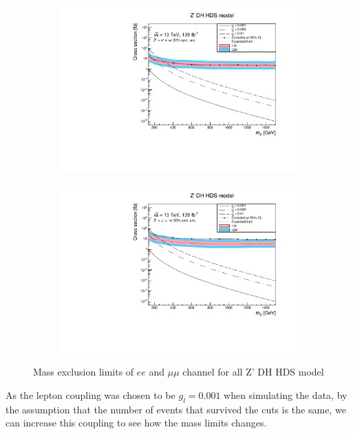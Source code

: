 \documentclass[14pt, a4paper]{book}
\begin{document}
\begin{figure}[!ht]
	\centering
   \begin{subfigure}[b]{0.49\textwidth}
      \centering
      \includegraphics[width=1\textwidth]{Limits/DH_HDS/mass_exclusion_ee.pdf}
      \end{subfigure}
   \hfill
   \begin{subfigure}[b]{0.49\textwidth}
      \centering
      \includegraphics[width=1\textwidth]{Limits/DH_HDS/mass_exclusion_uu.pdf}
      \end{subfigure}
   \caption{Mass exclusion limits of $ee$ and $\mu\mu$ channel for all Z' DH HDS model}\label{fig:DH_HDS_exclusion_ee_uu}
\end{figure}
As the lepton coupling was chosen to be $g_l=0.001$ when simulating the data, by the assumption that the number of events that survived the cuts is the same, we can increase this coupling to see how the mass limits changes.
\end{document}
